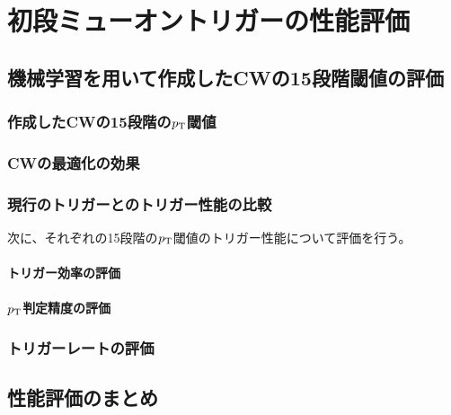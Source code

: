 \chapter{初段ミューオントリガーの性能評価}\label{chapter5}

\section{機械学習を用いて作成したCWの15段階閾値の評価}

\subsection{作成したCWの15段階の$p_{\rm{T}}$閾値}

\subsection{CWの最適化の効果}

\subsection{現行のトリガーとのトリガー性能の比較}
次に、それぞれの15段階の$p_{\rm{T}}$閾値のトリガー性能について評価を行う。

\subsubsection{トリガー効率の評価}

\subsubsection{$p_{\rm{T}}$判定精度の評価}\label{分解能の評価}

\subsection{トリガーレートの評価}

\section{性能評価のまとめ}